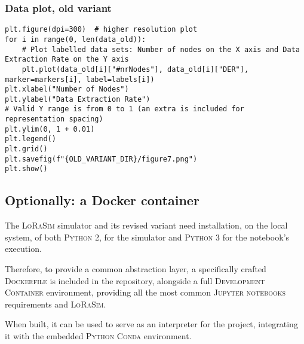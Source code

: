 \documentclass[a4paper,11pt]{article} %
\begin{document}
    \subsubsection*{Data plot, old variant}

    \begin{verbatim}
plt.figure(dpi=300)  # higher resolution plot
for i in range(0, len(data_old)):
    # Plot labelled data sets: Number of nodes on the X axis and Data Extraction Rate on the Y axis
    plt.plot(data_old[i]["#nrNodes"], data_old[i]["DER"], marker=markers[i], label=labels[i])
plt.xlabel("Number of Nodes")
plt.ylabel("Data Extraction Rate")
# Valid Y range is from 0 to 1 (an extra is included for representation spacing)
plt.ylim(0, 1 + 0.01)
plt.legend()
plt.grid()
plt.savefig(f"{OLD_VARIANT_DIR}/figure7.png")
plt.show()
    \end{verbatim}

    \subsection{Optionally: a Docker container}\label{subsec:optionally:-a-docker-container}

    The \textsc{LoRaSim} simulator and its revised variant need installation, on the local system, of both \textsc{Python 2}, for the simulator and \textsc{Python 3} for the notebook's execution.

    \smallskip

    Therefore, to provide a common abstraction layer, a specifically crafted \textsc{Dockerfile} is included in the repository, alongside a full \textsc{Development Container} environment, providing all the most common \textsc{Jupyter notebooks} requirements and \textsc{LoRaSim}.

    \smallskip

    When built, it can be used to serve as an interpreter for the project, integrating it with the embedded \textsc{Python Conda} environment.
\end{document}

